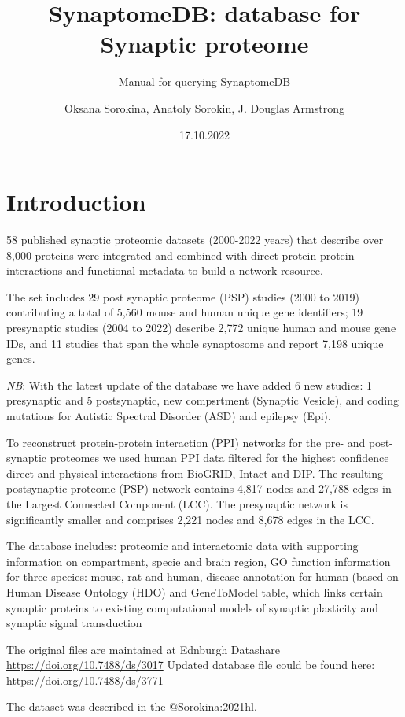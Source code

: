 \documentclass[
]{article}
\title{SynaptomeDB: database for Synaptic proteome}
\subtitle{Manual for querying SynaptomeDB}
\author{Oksana Sorokina, Anatoly Sorokin, J. Douglas Armstrong}
\date{17.10.2022}
\begin{document}
\maketitle

\hypertarget{introduction}{%
\section{Introduction}\label{introduction}}

58 published synaptic proteomic datasets (2000-2022 years) that describe
over 8,000 proteins were integrated and combined with direct
protein-protein interactions and functional metadata to build a network
resource.

The set includes 29 post synaptic proteome (PSP) studies (2000 to 2019)
contributing a total of 5,560 mouse and human unique gene identifiers;
19 presynaptic studies (2004 to 2022) describe 2,772 unique human and
mouse gene IDs, and 11 studies that span the whole synaptosome and
report 7,198 unique genes.

\emph{NB}: With the latest update of the database we have added 6 new
studies: 1 presynaptic and 5 postsynaptic, new compsrtment (Synaptic
Vesicle), and coding mutations for Autistic Spectral Disorder (ASD) and
epilepsy (Epi).

To reconstruct protein-protein interaction (PPI) networks for the pre-
and post-synaptic proteomes we used human PPI data filtered for the
highest confidence direct and physical interactions from BioGRID, Intact
and DIP. The resulting postsynaptic proteome (PSP) network contains
4,817 nodes and 27,788 edges in the Largest Connected Component (LCC).
The presynaptic network is significantly smaller and comprises 2,221
nodes and 8,678 edges in the LCC.

The database includes: proteomic and interactomic data with supporting
information on compartment, specie and brain region, GO function
information for three species: mouse, rat and human, disease annotation
for human (based on Human Disease Ontology (HDO) and GeneToModel table,
which links certain synaptic proteins to existing computational models
of synaptic plasticity and synaptic signal transduction

The original files are maintained at Ednburgh Datashare
\url{https://doi.org/10.7488/ds/3017} Updated database file could be
found here: \url{https://doi.org/10.7488/ds/3771}

The dataset was described in the @Sorokina:2021hl.
\end{document}
